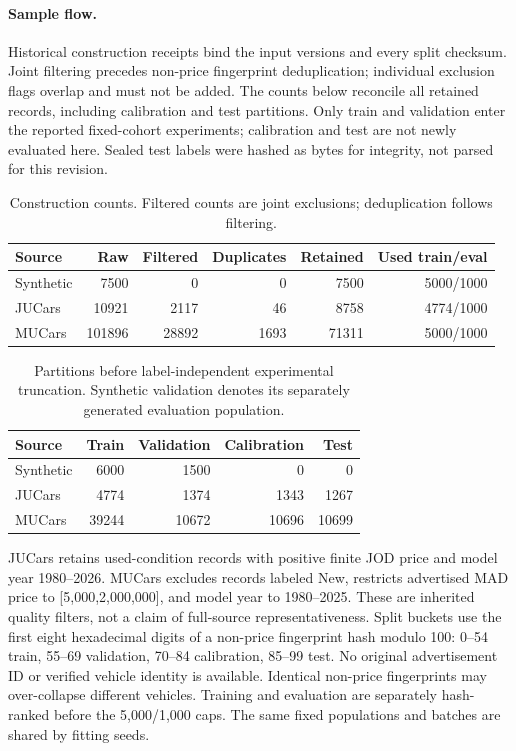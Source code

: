 \documentclass[11pt]{article}
\begin{document}
\paragraph{Sample flow.}
Historical construction receipts bind the input versions and every split
checksum. Joint filtering precedes non-price fingerprint deduplication;
individual exclusion flags overlap and must not be added. The counts below
reconcile all retained records, including calibration and test partitions.
Only train and validation enter the reported fixed-cohort experiments;
calibration and test are not newly evaluated here. Sealed test labels were
hashed as bytes for integrity, not parsed for this revision.
\begin{table}[htbp]\centering\small
\caption{Construction counts. Filtered counts are joint exclusions; deduplication follows filtering.}
\begin{tabular}{lrrrrr}\toprule
Source & Raw & Filtered & Duplicates & Retained & Used train/eval\\\midrule
Synthetic & 7500 & 0 & 0 & 7500 & 5000/1000\\
JUCars & 10921 & 2117 & 46 & 8758 & 4774/1000\\
MUCars & 101896 & 28892 & 1693 & 71311 & 5000/1000\\
\bottomrule\end{tabular}\end{table}\begin{table}[htbp]\centering\small
\caption{Partitions before label-independent experimental truncation. Synthetic validation denotes its separately generated evaluation population.}
\begin{tabular}{lrrrr}\toprule
Source & Train & Validation & Calibration & Test\\\midrule
Synthetic & 6000 & 1500 & 0 & 0\\
JUCars & 4774 & 1374 & 1343 & 1267\\
MUCars & 39244 & 10672 & 10696 & 10699\\
\bottomrule\end{tabular}\end{table}
JUCars retains used-condition records with positive finite JOD price and
model year 1980--2026. MUCars excludes records labeled New, restricts advertised
MAD price to [5,000,2,000,000], and model year to 1980--2025. These are inherited
quality filters, not a claim of full-source representativeness. Split buckets
use the first eight hexadecimal digits of a non-price fingerprint hash modulo
100: 0--54 train, 55--69 validation, 70--84 calibration, 85--99 test.
No original advertisement ID or verified vehicle identity is available.
Identical non-price fingerprints may over-collapse different vehicles.
Training and evaluation are separately hash-ranked before the 5,000/1,000
caps. The same fixed populations and batches are shared by fitting seeds.
\end{document}
